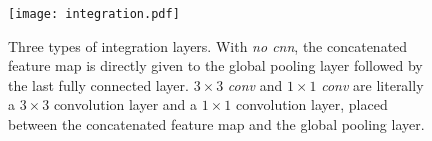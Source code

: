 \documentclass[journal]{IEEEtran}
\begin{document}


\begin{figure}[!t]
\centering
\texttt{[image: integration.pdf]}
\caption{Three types of integration layers.
With \emph{no cnn}, the concatenated feature map is directly given to the global pooling layer followed by the last fully connected layer.
$3\times3$ \emph{conv} and $1\times1$ \emph{conv} are literally a $3\times3$ convolution layer and a $1\times1$ convolution layer, placed between the concatenated feature map and the global pooling layer.
}
\label{fig:Integration}
\end{figure}
\end{document}
